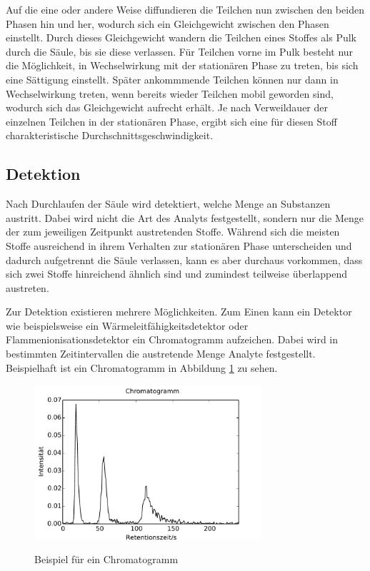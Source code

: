 Auf die eine oder andere Weise diffundieren die Teilchen nun zwischen den beiden Phasen hin und her, wodurch sich ein Gleichgewicht zwischen den Phasen einstellt. Durch dieses Gleichgewicht wandern die Teilchen eines Stoffes als Pulk durch die Säule, bis sie diese verlassen. Für Teilchen vorne im Pulk besteht nur die Möglichkeit, in Wechselwirkung mit der stationären Phase zu treten, bis sich eine Sättigung einstellt. Später ankommmende Teilchen können nur dann in Wechselwirkung treten, wenn bereits wieder Teilchen mobil geworden sind, wodurch sich das Gleichgewicht aufrecht erhält. 
Je nach Verweildauer der einzelnen Teilchen in der stationären Phase, ergibt sich eine für diesen Stoff charakteristische Durchschnittsgeschwindigkeit.%


\subsection{Detektion}
Nach Durchlaufen der Säule wird detektiert, welche Menge an Substanzen austritt. Dabei wird nicht die Art des Analyts festgestellt, sondern nur die Menge der zum jeweiligen Zeitpunkt austretenden Stoffe. Während sich die meisten Stoffe ausreichend in ihrem Verhalten zur stationären Phase unterscheiden und dadurch aufgetrennt die Säule verlassen, kann es aber durchaus vorkommen, dass sich zwei Stoffe hinreichend ähnlich sind und  zumindest teilweise überlappend austreten.

Zur Detektion existieren mehrere Möglichkeiten. Zum Einen kann ein Detektor wie beispielsweise ein Wärmeleitfähigkeitsdetektor oder Flammenionisationsdetektor ein Chromatogramm aufzeichen. Dabei wird in bestimmten Zeitintervallen die austretende Menge Analyte festgestellt. Beispielhaft ist ein Chromatogramm in Abbildung \ref{chromatogramm} zu sehen. 

\begin{figure}
 \centering
  \includegraphics[width = 0.75\textwidth]{bilder/spektrum}\\
  \caption{Beispiel für ein Chromatogramm}
  \label{chromatogramm}
\end{figure}

